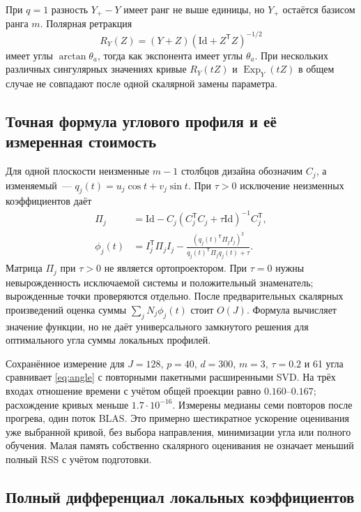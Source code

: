 \documentclass[11pt,a4paper]{article}
\numberwithin{equation}{section}
\newcommand{\Id}{\mathrm{Id}}
\newcommand{\T}{^{\mathsf T}}
\begin{document}
При $q=1$ разность $Y_+-Y$ имеет ранг не выше единицы,
но $Y_+$ остаётся базисом ранга $m$. Полярная ретракция
\[
 R_Y(Z)=(Y+Z)(\Id+Z\T Z)^{-1/2}
\]
имеет углы $\arctan\theta_a$, тогда как экспонента имеет углы
$\theta_a$. При нескольких различных сингулярных значениях
кривые $R_Y(tZ)$ и $\operatorname{Exp}_Y(tZ)$ в общем случае
не совпадают после одной скалярной замены параметра.\cite{unified,glmcheck}

\subsection{Точная формула углового профиля и её измеренная стоимость}

Для одной плоскости неизменные $m-1$ столбцов дизайна обозначим
$C_j$, а изменяемый~--- $q_j(t)=u_j\cos t+v_j\sin t$.
При $\tau>0$ исключение неизменных коэффициентов даёт
\begin{align}
 \Pi_j&=\Id-C_j(C_j\T C_j+\tau\Id)^{-1}C_j\T,\nonumber\\
 \phi_j(t)&=I_j\T\Pi_jI_j-
 \frac{(q_j(t)\T\Pi_jI_j)^2}{q_j(t)\T\Pi_jq_j(t)+\tau}.
 \label{eq:angle}
\end{align}
Матрица $\Pi_j$ при $\tau>0$ не является ортопроектором.
При $\tau=0$ нужны невырожденность исключаемой системы
и положительный знаменатель; вырожденные точки проверяются отдельно.
После предварительных скалярных произведений оценка суммы
$\sum_jN_j\phi_j(t)$ стоит $O(J)$. Формула вычисляет значение
функции, но не даёт универсального замкнутого решения для оптимального
угла суммы локальных профилей.

Сохранённое измерение для $J=128$, $p=40$, $d=300$, $m=3$,
$\tau=0.2$ и 61 угла сравнивает \eqref{eq:angle} с повторными
пакетными расширенными SVD. На трёх входах отношение времени
с учётом общей проекции равно $0.160$--$0.167$; расхождение кривых
меньше $1.7\cdot10^{-16}$. Измерены медианы семи повторов
после прогрева, один поток BLAS. Это примерно шестикратное ускорение
оценивания уже выбранной кривой, без выбора направления, минимизации
угла или полного обучения. Малая память собственно скалярного
оценивания не означает меньший полный RSS с учётом подготовки.
\cite{theorychecks}

\subsection{Полный дифференциал локальных коэффициентов}
\end{document}
